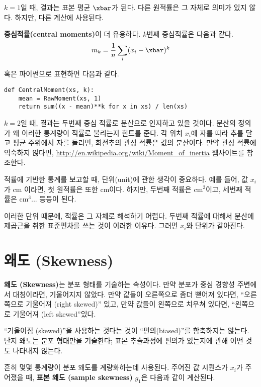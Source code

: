 $k=1$일 때, 결과는 표본 평균 $\xbar$가 된다.
다른 원적률은 그 자체로 의미가 있지 않다. 하지만, 다른 계산에 사용된다.

{\bf 중심적률(central moments)}이 더 유용하다. 
$k$번째 중심적률은 다음과 같다.
%
\[ m_k = \frac{1}{n} \sum_i (x_i - \xbar)^k \]
%

혹은 파이썬으로 표현하면 다음과 같다.

\begin{verbatim}
def CentralMoment(xs, k):
    mean = RawMoment(xs, 1)
    return sum((x - mean)**k for x in xs) / len(xs)
\end{verbatim}

$k=2$일 때, 결과는 두번째 중심 적률로 분산으로 인지하고 있을 것이다.
분산의 정의가 왜 이러한 통계량이 적률로 불리는지 힌트를 준다.
각 위치 $x_i$에 자를 따라 추를 달고 평균 주위에서 자를 돌리면, 
회전추의 관성 적률은 값의 분산이다. 만약 관성 적률에 익숙하지 않다면,
\url{http://en.wikipedia.org/wiki/Moment_of_inertia} 웹사이트를 참조한다.  

적률에 기반한 통계를 보고할 때, 단위(unit)에 관한 생각이 중요하다.
예를 들어, 값 $x_i$가 cm 이라면, 첫 원적률은 또한 cm이다.
하지만, 두번째 적률은 cm$^2$이고, 세번째 적률은 cm$^3$... 등등이 된다.

이러한 단위 때문에, 적률은 그 자체로 해석하기 어렵다.
두번째 적률에 대해서 분산에 제곱근을 취한 표준편차를 쓰는 것이 이러한 이유다. 
그러면 $x_i$와 단위가 같아진다.


\section{왜도 (Skewness)}

{\bf 왜도 (Skewness)}는 분포 형태를 기술하는 속성이다. 
만약 분포가 중심 경향성 주변에서 대칭이라면, 기울어지지 않았다.
만약 값들이 오른쪽으로 좀더 뻗어져 있다면, ``오른쪽으로 기울어져 (right
skewed)'' 있고, 만약 값들이 왼쪽으로 치우쳐 있다면, ``왼쪽으로 기울어져 (left
skewed''있다.


``기울어짐 (skewed)''을 사용하는 것다는 것이 ``편의(biased)''를 함축하지는 않는다.
단지 왜도는 분포 형태만을 기술한다; 표본 추출과정에 편의가 있는지에 관해 
어떤 것도 나타내지 않는다.


흔히 몇몇 통계량이 분포 왜도를 계량화하는데 사용된다.
주어진 값 시퀀스가 $x_i$가 주어졌을 때, 
{\bf 표본 왜도 (sample skewness)} $g_1$은 다음과 같이 계산된다.

